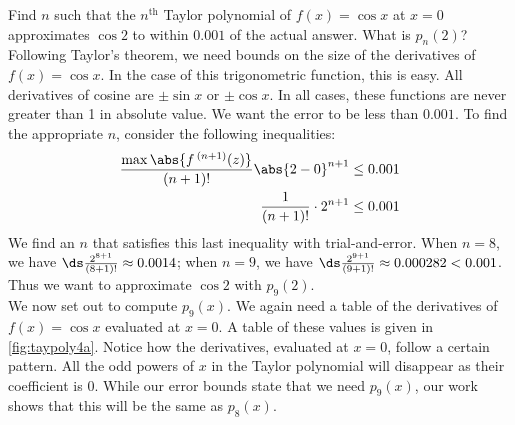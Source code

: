 \begin{example}\label{ex_taypoly4}
Find $n$ such that the $n^\text{th}$ Taylor polynomial of $f(x)=\cos x$ at $x=0$ approximates $\cos 2$ to within $0.001$ of the actual answer. What is $p_n(2)$?
\solution
Following Taylor's theorem, we need bounds on the size of the derivatives of $f(x)=\cos x$. In the case of this trigonometric function, this is easy. All derivatives of cosine are $\pm \sin x$ or $\pm \cos x$. In all cases, these functions are never greater than 1 in absolute value. We want the error to be less than $0.001$. To find the appropriate $n$, consider the following inequalities:
\begin{align*}
\frac{\max\abs{f\,^{(n+1)}(z)}}{(n+1)!}\abs{2-0}^{n+1} &\leq 0.001 \\
\frac1{(n+1)!}\cdot2^{n+1} &\leq 0.001
\end{align*}
We find an $n$ that satisfies this last inequality with trial-and-error. When $n=8$, we have $\ds \frac{2^{8+1}}{(8+1)!} \approx 0.0014$; when $n=9$, we have $\ds \frac{2^{9+1}}{(9+1)!} \approx 0.000282 <0.001$. Thus we want to approximate $\cos 2$ with $p_9(2)$.\\

We now set out to compute $p_9(x)$. We again need a table of the derivatives of $f(x)=\cos x$ evaluated at $x=0$. A table of these values is given in \autoref{fig:taypoly4a}. Notice how the derivatives, evaluated at $x=0$, follow a certain pattern. All the odd powers of $x$ in the Taylor polynomial will disappear as their coefficient is 0. While our error bounds state that we need $p_9(x)$, our work shows that this will be the same as $p_8(x)$. 


\end{example}
